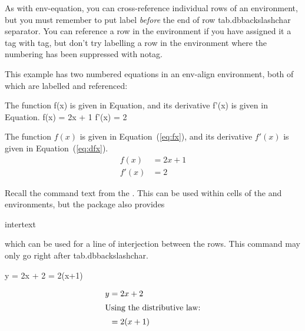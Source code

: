 As with \gls{env-equation}, you can cross-reference individual rows
of an  environment, but you must remember to
put \gls{label} \emph{before} the end of row \gls{tab.dbbackslashchar}
separator. You can reference a row in the 
environment if you have assigned it a tag with \gls{tag}, but don't
try labelling a row in the  environment where the
numbering has been suppressed with \gls{notag}.


This example has two numbered equations in an \gls{env-align} environment,
both of which are labelled and referenced:
\begin{code}
The function f(x) is given in 
Equation,
and its derivative f'(x) is given in 
Equation.
\newline
{}\newline
f(x) = 2x + 1
\newline
f'(x) = 2 \newline
{}
\end{code}
\begin{result}
The function $f(x)$ is given in Equation~(\ref*{eq:fx}), and its
derivative $f'(x)$ is given in Equation~(\ref*{eq:dfx}).
\begin{align}
f(x) &= 2x + 1\label{eq:fx}\\
f'(x) &= 2 \label{eq:dfx}
\end{align}
\end{result}

Recall the command \gls{text} from the
. This can be used
within cells of the  and 
environments, but the  package also provides
\begin{definition}
\gls{intertext}
\end{definition}
which can be used for a line of interjection between the rows. This
command may only go right after \gls{tab.dbbackslashchar}.


\begin{code}
\newline
y = 2x +
2\newline
{}\newline
  = 2(x+1)\newline
{}
\end{code}
\begin{result}
\begin{align*}
y &= 2x + 2\\
\intertext{Using the distributive law:}
  &= 2(x+1)
\end{align*}
\end{result}\bookpagebreak


